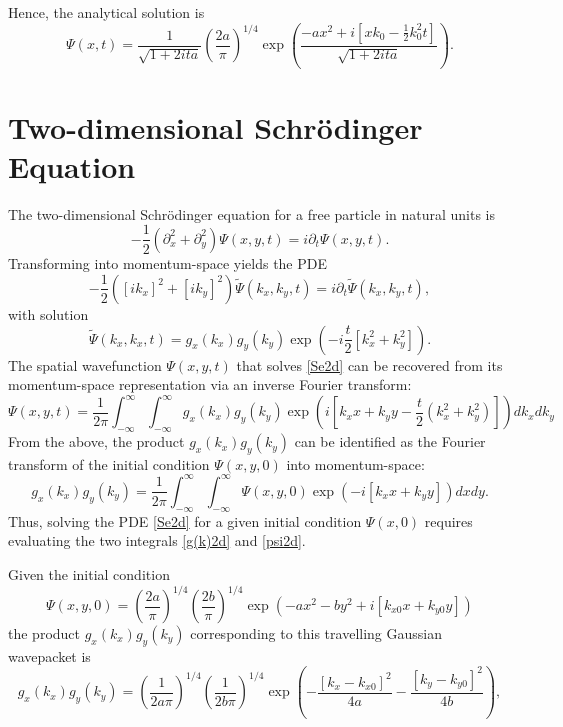 \documentclass[11pt]{article}
\begin{document}
Hence, the analytical solution is 
\begin{equation*}
\boxed{\Psi (x,t) = \frac{1}{\sqrt{1+ 2ita}} \left( \frac{2a}{\pi} \right)^{1/4}  \exp \left( \frac{-ax^2 +i\left[xk_0 - \frac{1}{2}k_0^2 t \right]}{\sqrt{1+2ita}} \right)}.
\end{equation*}

\section{Two-dimensional Schr{\"o}dinger Equation}
The two-dimensional Schr{\"o}dinger equation for a free particle in natural units is 
\begin{equation}\label{Se2d}
- \frac{1}{2} \left( \partial_x^2 +  \partial_y^2 \right) \Psi(x,y,t) = i \partial_t \Psi(x,y,t).
\end{equation}
Transforming into momentum-space yields the PDE
$$ - \frac{1}{2} \left( [i k_x ]^2 + [i k_y]^2 \right) \tilde{\Psi}(k_x, k_y,t) = i \partial_t \tilde{\Psi}(k_x, k_y,t),$$
with solution
$$ \tilde{\Psi}(k_x,k_x,t) = g_x(k_x) g_y(k_y) \exp \left({-i \frac{t}{2}}[k_x^2 + k_y^2] \right).$$
The spatial wavefunction $\Psi (x,y,t)$ that solves \eqref{Se2d} can be recovered from its momentum-space representation via an inverse Fourier transform:
\begin{equation}\label{psi2d}
 \Psi(x,y,t) = \frac{1}{2\pi} \int_{-\infty}^\infty \int_{-\infty}^\infty g_x(k_x) g_y(k_y) \exp\left( i\left[k_xx+k_yy - \frac{t}{2}(k_x^2 +k_y^2)  \right] \right)dk_x dk_y  
\end{equation}
From the above, the product $g_x(k_x)g_y(k_y)$ can be identified as the Fourier transform of the initial condition $\Psi (x,y,0)$ into momentum-space:
\begin{equation}\label{g(k)2d}
g_x(k_x) g_y(k_y)= \frac{1}{2\pi} \int_{-\infty}^\infty \int_{-\infty}^\infty \Psi (x,y,0) \exp({-i[k_xx+k_yy]}) dxdy.
\end{equation}
Thus, solving the PDE \eqref{Se2d} for a given initial condition $\Psi (x,0)$ requires evaluating the two integrals \eqref{g(k)2d} and \eqref{psi2d}.  \par 
Given the initial condition 
\begin{equation}\label{in_cond2d}
 \Psi (x,y,0) = \left( \frac{2a}{\pi} \right)^{1/4} \left( \frac{2b}{\pi} \right)^{1/4} \exp({-ax^2-by^2+i[k_{x0} x+k_{y0} y]})
\end{equation}
the product $g_x(k_x)g_y(k_y)$ corresponding to this travelling Gaussian wavepacket is 
\begin{equation}\label{g(k)_sol2d}
g_x(k_x)g_y(k_y) = \left( \frac{1}{2 a \pi} \right)^{1/4}\left( \frac{1}{2 b \pi} \right)^{1/4} \exp\left(- \frac{[k_x-k_{x0}]^2}{4a}- \frac{[k_y-k_{y0}]^2}{4b} \right),
\end{equation}
\end{document}
